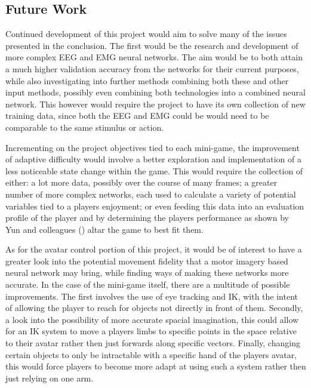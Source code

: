 \documentclass[11pt, a4paper]{article}
\newcommand{\cciteyear}[1]{(\citeyear{#1})}
\begin{document}
\subsection{Future Work}			%

Continued development of this project would aim to solve many of the issues presented in the conclusion. The first would be the research and development of more complex EEG and EMG neural networks. The aim would be to both attain a much higher validation accuracy from the networks for their current purposes, while also investigating into further methods combining both these and other input methods, possibly even combining both technologies into a combined neural network. This however would require the project to have its own collection of new training data, since both the EEG and EMG could be would need to be comparable to the same stimulus or action.

\hfill

Incrementing on the project objectives tied to each mini-game, the improvement of adaptive difficulty would involve a better exploration and implementation of a less noticeable state change within the game. This would require the collection of either: a lot more data, possibly over the course of many frames; a greater number of more complex networks, each used to calculate a variety of potential variables tied to a players enjoyment; or even feeding this data into an evaluation profile of the player and by determining the players performance as shown by Yun and colleagues \cciteyear{yun2010pads} altar the game to best fit them. 

\pagebreak

As for the avatar control portion of this project, it would be of interest to have a greater look into the potential movement fidelity that a motor imagery based neural network may bring, while finding ways of making these networks more accurate. In the case of the mini-game itself, there are a multitude of possible improvements. The first involves the use of eye tracking and IK, with the intent of allowing the player to reach for objects not directly in front of them. Secondly, a look into the possibility of more accurate spacial imagination, this could allow for an IK system to move a players limbs to specific points in the space relative to their avatar rather then just forwards along specific vectors. Finally, changing certain objects to only be intractable with a specific hand of the players avatar, this would force players to become more adapt at using such a system rather then just relying on one arm.







\pagebreak
\printbibliography[notkeyword = software, title = References]

\pagebreak
\printbibliography[keyword = game, keyword = software, title = Games]
\printbibliography[notkeyword = game, keyword = software, title = Software]
\end{document}
